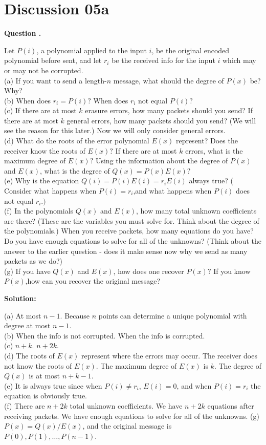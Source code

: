 \documentclass[12pt]{article}
\newcounter{questionnumber}
\newenvironment{question}[1][]{\stepcounter{questionnumber}\par\noindent\textbf{Question \thequestionnumber. #1}\par}{\par}
\newenvironment{solution}{\par\noindent\textbf{Solution:}\par}{\par\vspace{1em}}
\begin{document}
\section{Discussion 05a}
\begin{question}
    Let $P(i)$, a polynomial applied to the input $i$, be the original encoded polynomial before sent, and let $r_i$ be the received info for the input $i$ which may or may not be corrupted.\\
    (a) If you want to send a length-$n$ message, what should the degree of $P(x)$ be? Why?\\
    (b) When does $r_i=P(i)?$ When does $r_i$ not equal $P(i)?$\\
    (c) If there are at most $k$ erasure errors, how many packets should you send? If there are at most $k$ general errors, how many packets should you send? (We will see the reason for this later.) Now we will only consider general errors.\\
    (d) What do the roots of the error polynomial $E(x)$ represent? Does the receiver know the roots of
    $E(x)?$ If there are at most $k$ errors, what is the maximum degree of $E(x)?$ Using the information
    about the degree of $P(x)$ and $E(x)$, what is the degree of $Q(x)=P(x)E(x)?$\\
    (e) Why is the equation $Q(i) = P(i) E(i) = r_iE(i)$ always true? ( Consider what happens when $P( i) = r_i$,and what happens when $P( i)$ does not equal $r_i. )$\\
    (f) In the polynomials $Q(x)$ and $E(x)$, how many total unknown coefficients are there? (These are the variables you must solve for. Think about the degree of the polynomials.) When you receive packets, how many equations do you have? Do you have enough equations to solve for all of the unknowns? (Think about the answer to the earlier question - does it make sense now why we send as many packets as we do?)\\
    (g) If you have $Q(x)$ and $E(x)$, how does one recover $P(x)?$ If you know $P(x)$,how can you recover
    the original message?
\end{question}
\begin{solution}
    \noindent
    (a) At most $n-1$. Because $n$ points can determine a unique polynomial with degree at most $n-1$.\\
    (b) When the info is not corrupted. When the info is corrupted.\\
    (c) $n+k$. $n+2k$.\\
    (d) The roots of $E(x)$ represent where the errors may occur.
    The receiver does not know the roots of $E(x)$.
    The maximum degree of $E(x)$ is $k$.
    The degree of $Q(x)$ is at most $n+k-1$.\\
    (e) It is always true since when $P(i) \neq r_i$, $E(i)=0$, and when $P(i)=r_i$ the equation is obviously true.\\
    (f) There are $n+2k$ total unknown coefficients. We have $n+2k$ equations after receiving packets. We have enough equations to solve for all of the unknowns.
    (g) $P(x)=Q(x)/E(x)$, and the original message is $P(0), P(1), \dots, P(n-1)$.
\end{solution}
\end{document}
